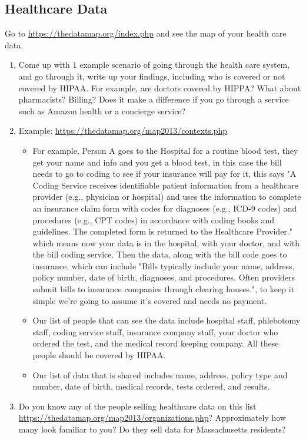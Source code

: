 \documentclass[12pt]{article}
\begin{document}
\subsection*{Healthcare Data}
Go to \url{https://thedatamap.org/index.php} and see the map of your health care data.  
\begin{enumerate}
    \item Come up with 1 example scenario of going through the health care system, and go through it, write up your findings, including who is covered or not covered by HIPAA.  For example, are doctors covered by HIPPA? What about pharmacists? Billing? Does it make a difference if you go through a service such as Amazon health or a concierge service?
    \item Example: \url{https://thedatamap.org/map2013/contexts.php}
        \begin{itemize}
            \item For example, Person A goes to the Hospital for a routine blood test, they get your name and info and you get a blood test, in this case the bill needs to go to coding to see if your insurance will pay for it, this says "A Coding Service receives identifiable patient information from a healthcare provider (e.g., physician or hospital) and uses the information to complete an insurance claim form with codes for diagnoses (e.g., ICD-9 codes) and procedures (e.g., CPT codes) in accordance with coding books and guidelines. The completed form is returned to the Healthcare Provider." which means now your data is in the hospital, with your doctor, and with the bill coding service. Then the data, along with the bill code goes to insurance, which can include "Bills typically include your name, address, policy number, date of birth, diagnoses, and procedures. Often providers submit bills to insurance companies through clearing houses.", to keep it simple we're going to assume it's covered and needs no payment. 
            \item Our list of people that can see the data include hospital staff, phlebotomy staff, coding service staff, insurance company staff, your doctor who ordered the test, and the medical record keeping company. All these people should be covered by HIPAA. 
            \item Our list of data that is shared includes name, address, policy type and number, date of birth, medical records, tests ordered, and results.
        \end{itemize}
    \item Do you know any of the people selling healthcare data on this list \url{https://thedatamap.org/map2013/organizations.php}? Approximately how many look familiar to you?  Do they sell data for Massachusetts residents?    
\end{enumerate}
\end{document}
